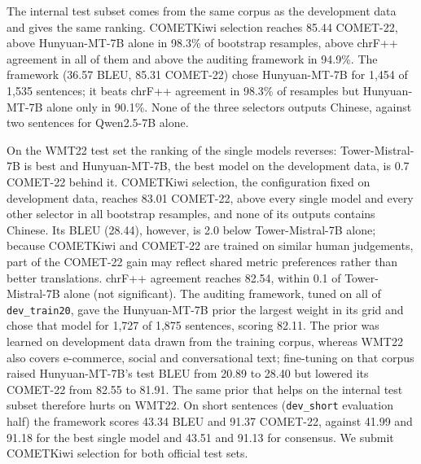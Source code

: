 \documentclass[11pt]{article}
\begin{document}
The internal test subset comes from the same corpus as the development data and gives the same ranking. COMETKiwi selection reaches 85.44 COMET-22, above Hunyuan-MT-7B alone in 98.3\% of bootstrap resamples, above chrF++ agreement in all of them and above the auditing framework in 94.9\%. The framework (36.57 BLEU, 85.31 COMET-22) chose Hunyuan-MT-7B for 1,454 of 1,535 sentences; it beats chrF++ agreement in 98.3\% of resamples but Hunyuan-MT-7B alone only in 90.1\%. None of the three selectors outputs Chinese, against two sentences for Qwen2.5-7B alone.

On the WMT22 test set the ranking of the single models reverses: Tower-Mistral-7B is best and Hunyuan-MT-7B, the best model on the development data, is 0.7 COMET-22 behind it. COMETKiwi selection, the configuration fixed on development data, reaches 83.01 COMET-22, above every single model and every other selector in all bootstrap resamples, and none of its outputs contains Chinese. Its BLEU (28.44), however, is 2.0 below Tower-Mistral-7B alone; because COMETKiwi and COMET-22 are trained on similar human judgements, part of the COMET-22 gain may reflect shared metric preferences rather than better translations. chrF++ agreement reaches 82.54, within 0.1 of Tower-Mistral-7B alone (not significant). The auditing framework, tuned on all of \texttt{dev\_train20}, gave the Hunyuan-MT-7B prior the largest weight in its grid and chose that model for 1,727 of 1,875 sentences, scoring 82.11. The prior was learned on development data drawn from the training corpus, whereas WMT22 also covers e-commerce, social and conversational text; fine-tuning on that corpus raised Hunyuan-MT-7B's test BLEU from 20.89 to 28.40 but lowered its COMET-22 from 82.55 to 81.91. The same prior that helps on the internal test subset therefore hurts on WMT22. On short sentences (\texttt{dev\_short} evaluation half) the framework scores 43.34 BLEU and 91.37 COMET-22, against 41.99 and 91.18 for the best single model and 43.51 and 91.13 for consensus. We submit COMETKiwi selection for both official test sets.
\end{document}
